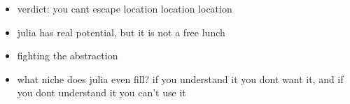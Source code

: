 \documentclass[14pt]{beamer}
\begin{document}
\begin{frame}
    \centering
    \begin{itemize}
        \item verdict: you cant escape location location
            location
        \item julia has real potential, but it is not a free
            lunch
        \item fighting the abstraction
        \item what niche does julia even fill? if you
            understand it you dont want it, and if you dont
            understand it you can't use it
    \end{itemize}
\end{frame}
\end{document}
